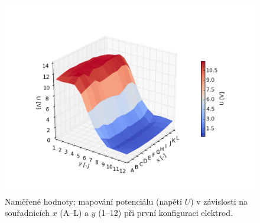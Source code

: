 \documentclass[english]{article}
\begin{document}
\clearpage	
	\begin{figure}[h!]
	\begin{center}
	    \vspace*{-1.5cm}
		\includegraphics[width=\linewidth]{../gnuplot/konfigurace_1.png}
	    \vspace*{-2cm}
		\caption{Naměřené hodnoty; mapování potenciálu (napětí $U$) v závislosti na souřadnicích $x$ (A--L) a $y$ (1--12) při první konfiguraci elektrod.} 
		\label{fig:g_konf1}
	\end{center}
	\end{figure}			
\end{document}

